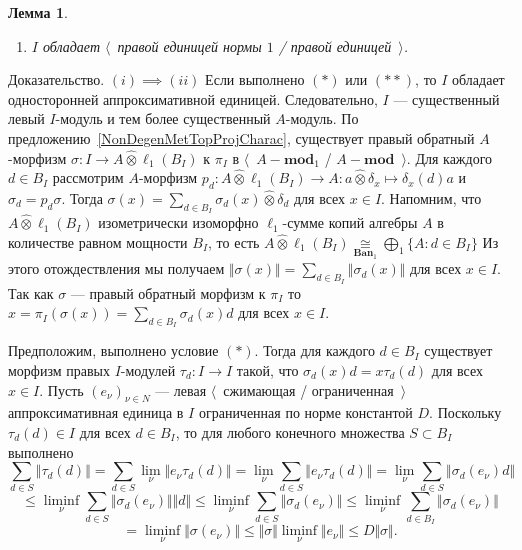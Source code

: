 \documentclass[12pt]{article}
\numberwithin{equation}{subsection}
\theoremstyle{plain}
\newtheorem{lemma}{Лемма}
\newenvironment{proof}{Доказательство.}{}
\newcommand{\projtens}{\mathbin{\widehat{\otimes}}}
\newcommand{\isom}[1]{\mathop{\mathbin{\cong}}\limits_{#1}}
\begin{document}
\begin{fulltext}
\begin{lemma}
\begin{enumerate}
    \item $I$ обладает $\langle$~правой единицей нормы $1$ / правой
    единицей~$\rangle$.
\end{enumerate}
\end{lemma} 
\begin{proof} $(i) \implies (ii)$ Если выполнено $(*)$ или $(**)$, то $I$
обладает односторонней аппроксимативной единицей. Следовательно, $I$ ---
существенный левый $I$-модуль и тем более существенный $A$-модуль. По
предложению~\ref{NonDegenMetTopProjCharac}, существует правый обратный
$A$-морфизм $\sigma:I\to A\projtens \ell_1(B_I)$ к $\pi_I$ в
$\langle$~$A-\mathbf{mod}_1$ / $A-\mathbf{mod}$~$\rangle$. Для каждого $d\in
B_I$ рассмотрим $A$-морфизм $p_d:A\projtens \ell_1(B_I)\to A:a\projtens
\delta_x\mapsto \delta_x(d)a$ и $\sigma_d=p_d\sigma$. Тогда
$\sigma(x)=\sum_{d\in B_I}\sigma_d(x)\projtens \delta_d$ для всех $x\in I$.
Напомним, что $A\projtens\ell_1(B_I)$ изометрически изоморфно $\ell_1$-сумме
копий алгебры $A$ в количестве равном мощности $B_I$, то есть
$A\projtens\ell_1(B_I)\isom{\mathbf{Ban}_1}\bigoplus_1 \{A:d\in B_I \}$ Из этого
отождествления мы получаем $\Vert\sigma(x)\Vert=\sum_{d\in B_I}
\Vert\sigma_d(x)\Vert$ для всех $x\in I$. Так как $\sigma$ --- правый обратный
морфизм к $\pi_I$ то $x=\pi_I(\sigma(x))=\sum_{d\in B_I}\sigma_d(x)d$ для всех
$x\in I$. 

Предположим, выполнено условие $(*)$. Тогда для каждого $d\in B_I$ существует
морфизм правых $I$-модулей $\tau_d:I\to I$ такой, что $\sigma_d(x)d=x\tau_d(d)$
для всех $x\in I$.  Пусть ${(e_\nu)}_{\nu\in N}$ --- левая $\langle$~сжимающая /
ограниченная~$\rangle$ аппроксимативная единица в $I$ ограниченная по норме
константой $D$. Поскольку $\tau_d(d)\in I$ для всех $d\in B_I$, то для любого
конечного множества $S\subset B_I$ выполнено
$$
\sum_{d\in S}\Vert \tau_d(d)\Vert
=\sum_{d\in S}\lim_{\nu}\Vert e_\nu \tau_d(d) \Vert
=\lim_{\nu}\sum_{d\in S}\Vert e_\nu \tau_d(d)\Vert
=\lim_{\nu}\sum_{d\in S}\Vert \sigma_d(e_\nu)d \Vert
$$
$$
\leq\liminf_{\nu}\sum_{d\in S}\Vert\sigma_d(e_\nu)\Vert\Vert d\Vert 
\leq\liminf_{\nu}\sum_{d\in S}\Vert\sigma_d(e_\nu)\Vert
\leq\liminf_{\nu}\sum_{d\in B_I}\Vert\sigma_d(e_\nu)\Vert
$$
$$
=\liminf_{\nu}\Vert\sigma(e_\nu)\Vert
\leq\Vert\sigma\Vert\liminf_{\nu}\Vert e_\nu\Vert
\leq D\Vert\sigma\Vert.
$$


\end{proof}
\end{fulltext}
\end{document}
